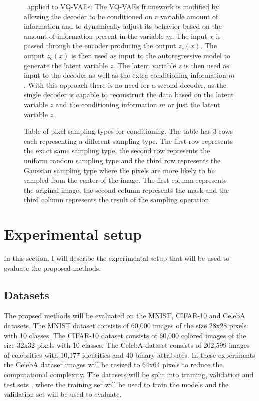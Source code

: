 \begin{figure}[H]
    \centering
    
    \caption[ applied to VQ-VAEs.]%
    {
        \methodTwo\ applied to VQ-VAEs. The VQ-VAEs framework is modified by allowing the decoder to be conditioned on a variable amount of information and to dynamically adjust its behavior based on the amount of information present in the variable $m$. The input $x$ is passed through the encoder producing the output $z_e(x)$. The output $z_e(x)$ is then used as input to the autoregressive model to generate the latent variable $z$. The latent variable $z$ is then used as input to the decoder as well as the extra conditioning information $m$. With this approach there is no need for a second decoder, as the single decoder is capable to reconstruct the data based on the latent variable $z$ and the conditioning information $m$ or just the latent variable $z$.
    }\label{SCVQVAE1DFigure}
\end{figure}

\begin{figure}
    \centering
    
    \caption[Table of pixel sampling types for conditioning.]%
    {
        Table of pixel sampling types for conditioning. The table has 3 rows each representing a different sampling type. The first row represents the exact same sampling type, the second row represents the uniform random sampling type and the third row represents the Gaussian sampling type where the pixels are more likely to be sampled from the center of the image. The first column represents the original image, the second column represents the mask and the third column represents the result of the sampling operation.
    }\label{SamplingFigure}
\end{figure}

\section{Experimental setup}

In this section, I will describe the experimental setup that will be used to evaluate the proposed methods.

\subsection{Datasets}

The propsed methods will be evaluated on the MNIST, CIFAR-10 and CelebA datasets. The MNIST dataset consists of 60,000 images of the size 28x28 pixels with 10 classes. The CIFAR-10 dataset consists of 60,000 colored images of the size 32x32 pixels with 10 classes.
The CelebA dataset consists of 202,599 images of celebrities with 10,177 identities and 40 binary attributes. In these experiments the CelebA dataset images will be resized to 64x64 pixels to reduce the computational complexity.
The datasets will be split into training, validation and test sets , where the training set will be used to train the models and the validation set will be used to evaluate.

